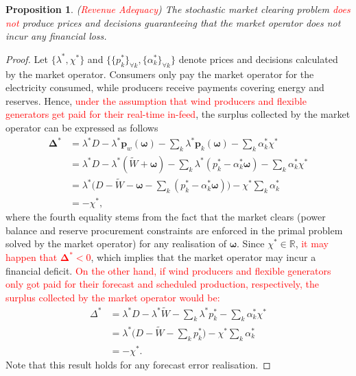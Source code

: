 \documentclass{article}
\newtheorem{proposition}{Proposition}
\begin{document}
\begin{proposition}
(\textcolor{red}{Revenue Adequacy}) The stochastic market clearing problem \textcolor{red}{does not} produce prices and decisions guaranteeing that the market operator does not incur any financial loss.
\end{proposition}
\begin{proof}
Let $\{\lambda^*, \chi^*\}$ and $\{\{p_k^*\}_{\forall k}, \{\alpha_k^*\}_{\forall k}\}$ denote prices and decisions calculated by the market operator. Consumers only pay the market operator for the electricity consumed, while producers receive payments covering energy and reserves. Hence, \textcolor{red}{under the assumption that wind producers and flexible generators get paid for their real-time in-feed}, the surplus collected by the market operator can be expressed as follows
\begin{align*}
\boldsymbol{\Delta}^* &= \lambda^*D - \lambda^*\mathbf{p}_w(\boldsymbol{\omega}) - \sum_k \lambda^*\mathbf{p}_k(\boldsymbol{\omega}) - \sum_k \alpha_k^* \chi^*\\
&= \lambda^*D - \lambda^*(\tilde{W} + \boldsymbol{\omega}) - \sum_k \lambda^*(p_k^* - \alpha_k^* \boldsymbol{\omega}) - \sum_k \alpha_k^* \chi^*\\
&= \lambda^*\big(D - \tilde{W} - \boldsymbol{\omega} - \sum_k (p_k^* - \alpha_k^* \boldsymbol{\omega})\big) - \chi^* \sum_k \alpha_k^*\\
&= -\chi^*,
\end{align*}
where the fourth equality stems from the fact that the market clears (power balance and reserve procurement constraints are enforced in the primal problem solved by the market operator) for any realisation of $\boldsymbol{\omega}$. Since $\chi^* \in \mathbb{R}$, \textcolor{red}{it may happen that $\boldsymbol{\Delta}^* < 0$}, which implies that the market operator may incur a financial deficit.
\textcolor{red}{On the other hand, if wind producers and flexible generators only got paid for their forecast and scheduled production, respectively, the surplus collected by the market operator would be:}
\begin{align*}
\Delta^* &= \lambda^*D - \lambda^*\tilde{W} - \sum_k \lambda^*p_k^* - \sum_k \alpha_k^* \chi^*\\
&= \lambda^*\big(D - \tilde{W} - \sum_k p_k^*\big) - \chi^* \sum_k \alpha_k^*\\
&= -\chi^*.
\end{align*}
Note that this result holds for any forecast error realisation.
\end{proof}
\end{document}
